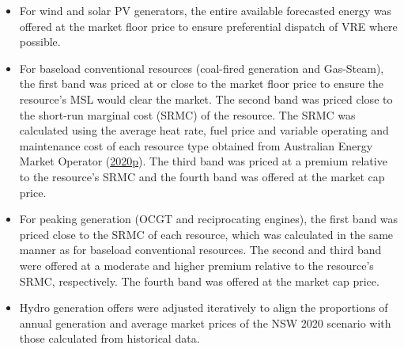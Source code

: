 \documentclass[12pt,a4paper,]{report}
\providecommand{\tightlist}{%
  \setlength{\itemsep}{0pt}\setlength{\parskip}{0pt}}
\begin{document}
\begin{itemize}
\tightlist
\item
  For wind and solar PV generators, the entire available forecasted
  energy was offered at the market floor price to ensure preferential
  dispatch of VRE where possible.
\item
  For baseload conventional resources (coal-fired generation and
  Gas-Steam), the first band was priced at or close to the market floor
  price to ensure the resource's MSL would clear the market. The second
  band was priced close to the short-run marginal cost (SRMC) of the
  resource. The SRMC was calculated using the average heat rate, fuel
  price and variable operating and maintenance cost of each resource
  type obtained from Australian Energy Market Operator
  (\protect\hyperlink{ref-australianenergymarketoperator2020InputsAssumptions2020}{2020p}).
  The third band was priced at a premium relative to the resource's SRMC
  and the fourth band was offered at the market cap price.
\item
  For peaking generation (OCGT and reciprocating engines), the first
  band was priced close to the SRMC of each resource, which was
  calculated in the same manner as for baseload conventional resources.
  The second and third band were offered at a moderate and higher
  premium relative to the resource's SRMC, respectively. The fourth band
  was offered at the market cap price.
\item
  Hydro generation offers were adjusted iteratively to align the
  proportions of annual generation and average market prices of the NSW
  2020 scenario with those calculated from historical data.
\end{itemize}

\def\pandoctableshortcapt{Offers by resource type for NSW and SA across
all scenarios}
\end{document}
